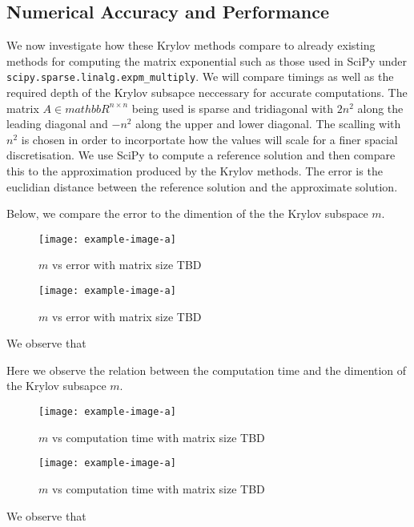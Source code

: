 \subsection{Numerical Accuracy and Performance}
We now investigate how these Krylov methods compare to already existing methods for computing the matrix exponential such as those used in SciPy under \verb|scipy.sparse.linalg.expm_multiply|\cite{AlMohy2011}\cite{Higham2010}.
We will compare timings as well as the required depth of the Krylov subsapce neccessary for accurate computations.
The matrix $A \in mathbb{R}^{n \times n}$ being used is sparse and tridiagonal with $2n^2$ along the leading diagonal and $-n^2$ along the upper and lower diagonal.
The scalling with $n^2$ is chosen in order to incorportate how the values will scale for a finer spacial discretisation.
We use SciPy to compute a reference solution and then compare this to the approximation produced by the Krylov methods.
The error is the euclidian distance between the reference solution and the approximate solution.

Below, we compare the error to the dimention of the the Krylov subspace $m$.
\begin{figure}[H]
    \centering
    \begin{minipage}{0.49\textwidth}
        \texttt{[image: example-image-a]} %
        \caption{$m$ vs error with matrix size TBD}
        \label{fig:mEKrylov1}
    \end{minipage}\hfill
    \centering
    \begin{minipage}{0.49\textwidth}
        \texttt{[image: example-image-a]} %
        \caption{$m$ vs error with matrix size TBD}
        \label{fig:mEKrylov2}
    \end{minipage}\hfill
\end{figure}
We observe that 

Here we observe the relation between the computation time and the dimention of the Krylov subsapce $m$.
\begin{figure}[H]
    \centering
    \begin{minipage}{0.49\textwidth}
        \texttt{[image: example-image-a]} %
        \caption{$m$ vs computation time with matrix size TBD}
        \label{fig:mCTKrylov1}
    \end{minipage}\hfill
    \centering
    \begin{minipage}{0.49\textwidth}
        \texttt{[image: example-image-a]} %
        \caption{$m$ vs computation time with matrix size TBD}
        \label{fig:mCTKrylov2}
    \end{minipage}\hfill
\end{figure}
We observe that 

